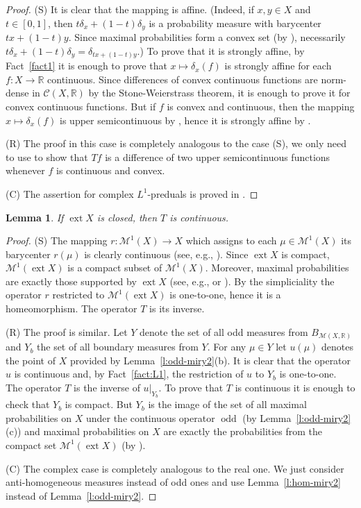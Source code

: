\documentclass{amsart}
\numberwithin{equation}{section}
\newtheorem{lemma}[thm]{Lemma}
\theoremstyle{definition}
\def\C{\mathcal C}
\def\M{\mathcal M}
\def\er{\mathbb R}
\def\r{|}
\def \ext {\operatorname{ext}}
\def\odd{\operatorname{odd}}
\begin{document}
\begin{proof}
(S) It is clear that the mapping is affine. (Indeed, if $x,y\in X$ and $t\in[0,1]$, then $t\delta_x+(1-t)\delta_y$ is a probability measure with barycenter $tx+(1-t)y$. Since maximal probabilities form a convex set (by \cite[Theorem 3.70]{lmns}), necessarily $t\delta_x+(1-t)\delta_y=\delta_{tx+(1-t)y}$.) To prove that it is strongly affine, by Fact~\ref{fact1} it is enough to prove that $x\mapsto\delta_x(f)$ is strongly affine for each $f:X\to\er$ continuous. Since differences of convex continuous functions are norm-dense in $\C(X,\er)$ by the Stone-Weierstrass theorem, it is enough to prove it for convex continuous functions. But if $f$ is convex and continuous, then the mapping $x\mapsto \delta_x(f)$ is upper semicontinuous by \cite[Theorem II.3.7]{alfsen}, hence it is strongly affine by \cite[Proposition A.122 and Theorem 4.21]{lmns}.

(R) The proof in this case is completely analogous to the case (S), we only need to use \cite[Chapter 7, \S 21, Theorem 7]{lacey}
to show that $Tf$ is a difference of two upper semicontinuous functions whenever $f$ is continuous and convex.

(C) The assertion for complex $L^1$-preduals is proved in \cite[Lemma~4.12]{petracek-spurny}.
\end{proof}

\begin{lemma}\label{l:bauer}
If $\ext X$ is closed, then $T$ is continuous.
\end{lemma}

\begin{proof}
(S) The mapping $r:\M^1(X)\to X$ which assigns to each $\mu\in\M^1(X)$ its barycenter $r(\mu)$ is clearly continuous (see, e.g., \cite[Proposition 3.40]{lmns}).
Since $\ext X$ is compact, $\M^1(\ext X)$ is a compact subset of $\M^1(X)$. Moreover, maximal probabilities are exactly those supported by $\ext X$ (see, e.g., \cite[p. 35]{alfsen} or \cite[Proposition 3.80]{lmns}). By the simpliciality the operator $r$ restricted to $\M^1(\ext X)$ is one-to-one, hence it is a homeomorphism. The operator $T$ is its inverse.

(R) The proof is similar. Let $Y$ denote the set of all odd measures from $B_{\M(X,\er)}$ and  $Y_b$ the set of all boundary measures from $Y$. For any $\mu\in Y$ let $u(\mu)$ denotes the point of $X$ provided by Lemma~\ref{l:odd-miry2}(b). It is clear that the operator $u$ is continuous and, by Fact~\ref{fact:L1}, the restriction of $u$ to $Y_b$ is one-to-one. The operator $T$ is the inverse of $u\r_{Y_b}$. To prove that $T$ is continuous it is enough to check that $Y_b$ is compact. But $Y_b$ is the image of the set of all maximal probabilities on $X$ under the continuous operator $\odd$ (by Lemma~\ref{l:odd-miry2}(c)) and maximal probabilities on $X$ are exactly the probabilities from the compact set $\M^1(\ext X)$ (by  \cite[Proposition 3.80]{lmns}).

(C) The complex case is completely analogous to the real one. We just consider anti-homogeneous measures instead of odd ones and use Lemma~\ref{l:hom-miry2} instead of Lemma~\ref{l:odd-miry2}.
\end{proof}
\end{document}

